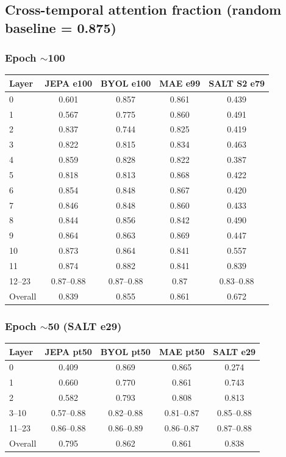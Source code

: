 \documentclass{article}
\begin{document}
\subsection{Cross-temporal attention fraction (random baseline = 0.875)}

\subsubsection{Epoch $\sim$100}
\begin{center}
\begin{tabular}{lcccc}
\toprule
Layer & JEPA e100 & BYOL e100 & MAE e99 & SALT S2 e79 \\
\midrule
0  & 0.601 & 0.857 & 0.861 & 0.439 \\
1  & 0.567 & 0.775 & 0.860 & 0.491 \\
2  & 0.837 & 0.744 & 0.825 & 0.419 \\
3  & 0.822 & 0.815 & 0.834 & 0.463 \\
4  & 0.859 & 0.828 & 0.822 & 0.387 \\
5  & 0.818 & 0.813 & 0.868 & 0.422 \\
6  & 0.854 & 0.848 & 0.867 & 0.420 \\
7  & 0.846 & 0.848 & 0.860 & 0.433 \\
8  & 0.844 & 0.856 & 0.842 & 0.490 \\
9  & 0.864 & 0.863 & 0.869 & 0.447 \\
10 & 0.873 & 0.864 & 0.841 & 0.557 \\
11 & 0.874 & 0.882 & 0.841 & 0.839 \\
12--23 & 0.87--0.88 & 0.87--0.88 & 0.87 & 0.83--0.88 \\
\midrule
Overall & 0.839 & 0.855 & 0.861 & 0.672 \\
\bottomrule
\end{tabular}
\end{center}

\subsubsection{Epoch $\sim$50 (SALT e29)}
\begin{center}
\begin{tabular}{lcccc}
\toprule
Layer & JEPA pt50 & BYOL pt50 & MAE pt50 & SALT e29 \\
\midrule
0     & 0.409 & 0.869 & 0.865 & 0.274 \\
1     & 0.660 & 0.770 & 0.861 & 0.743 \\
2     & 0.582 & 0.793 & 0.808 & 0.813 \\
3--10 & 0.57--0.88 & 0.82--0.88 & 0.81--0.87 & 0.85--0.88 \\
11--23 & 0.86--0.88 & 0.86--0.89 & 0.86--0.87 & 0.87--0.88 \\
\midrule
Overall & 0.795 & 0.862 & 0.861 & 0.838 \\
\bottomrule
\end{tabular}
\end{center}
\end{document}
